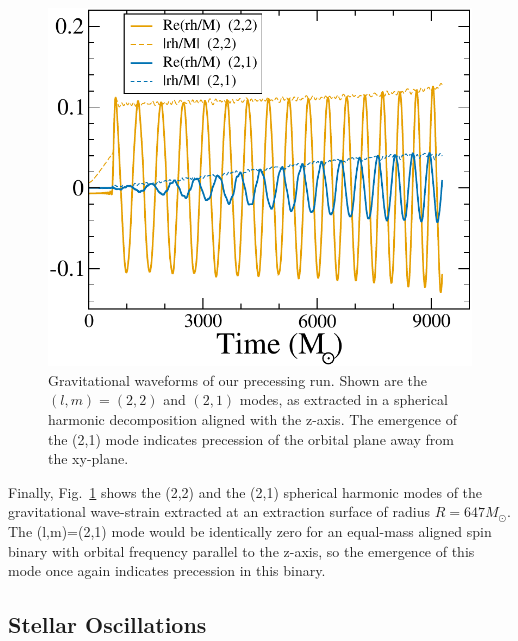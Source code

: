 \begin{figure}
\includegraphics[width=0.9\columnwidth]{chap2/PrecGW}
\caption[Gravitational waveforms of our precessing run.]{\label{fig:PrecGW} Gravitational waveforms of our precessing
  run. Shown are the $(l,m)=(2,2)$ and $(2,1)$ modes, as extracted in
  a spherical harmonic decomposition aligned with the z-axis. The
  emergence of the (2,1) mode indicates precession of the orbital
  plane away from the xy-plane.}
\end{figure}


Finally, Fig.~\ref{fig:PrecGW} shows the (2,2) and the (2,1) spherical
harmonic modes of the gravitational wave-strain extracted at an
extraction surface of radius $R=647M_\odot$. The
(l,m)=(2,1) mode would be identically zero for an equal-mass aligned
spin binary with orbital frequency parallel to the z-axis, so the
emergence of this mode once again indicates precession in this binary.




\subsection{Stellar Oscillations}
\label{sec:QNModes}

